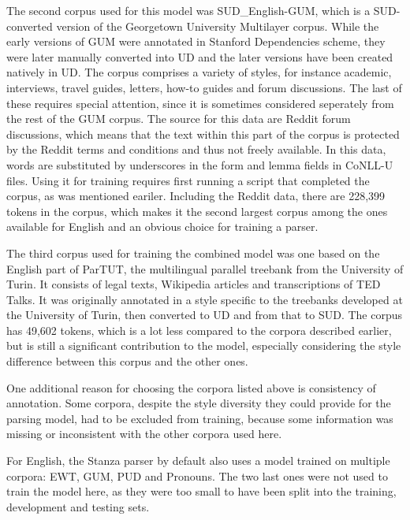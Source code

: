The second corpus used for this model was SUD\_English-GUM, which is a SUD-converted version of the Georgetown University Multilayer corpus. While the early versions of GUM were annotated in Stanford Dependencies scheme, they were later manually converted into UD and the later versions have been created natively in UD. The corpus comprises a variety of styles, for instance academic, interviews, travel guides, letters, how-to guides and forum discussions. The last of these requires special attention, since it is sometimes considered seperately from the rest of the GUM corpus. The source for this data are Reddit forum discussions, which means that the text within this part of the corpus is protected by the Reddit terms and conditions and thus not freely available. In this data, words are substituted by underscores in the form and lemma fields in CoNLL-U files. Using it for training requires first running a script that completed the corpus, as was mentioned eariler. Including the Reddit data, there are 228,399 tokens in the corpus, which makes it the second largest corpus among the ones available for English and an obvious choice for training a parser. 

The third corpus used for training the combined model was one based on the English part of ParTUT, the multilingual parallel treebank from the University of Turin. It consists of legal texts, Wikipedia articles and transcriptions of TED Talks. It was originally annotated in a style specific to the treebanks developed at the University of Turin, then converted to UD and from that to SUD. The corpus has 49,602 tokens, which is a lot less compared to the corpora described earlier, but is still a significant contribution to the model, especially considering the style difference between this corpus and the other ones. 

One additional reason for choosing the corpora listed above is consistency of annotation. Some corpora, despite the style diversity they could provide for the parsing model, had to be excluded from training, because some information was missing or inconsistent with the other corpora used here. 

For English, the Stanza parser by default also uses a model trained on multiple corpora: EWT, GUM, PUD and Pronouns. The two last ones were not used to train the model here, as they were too small to have been split into the training, development and testing sets. 

